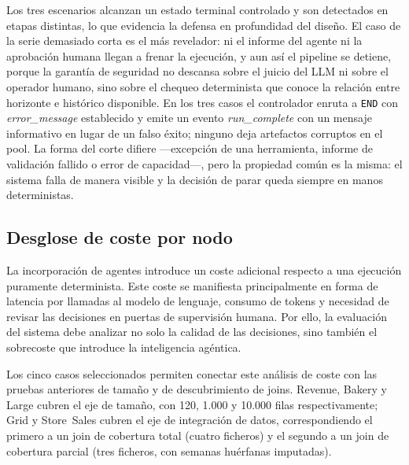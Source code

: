 \documentclass[12pt,a4paper]{article}
\theoremstyle{plain}
\begin{document}
Los tres escenarios alcanzan un estado terminal controlado y son detectados en etapas distintas, lo que evidencia la defensa en profundidad del diseño. El caso de la serie demasiado corta es el más revelador: ni el informe del agente ni la aprobación humana llegan a frenar la ejecución, y aun así el pipeline se detiene, porque la garantía de seguridad no descansa sobre el juicio del LLM ni sobre el operador humano, sino sobre el chequeo determinista que conoce la relación entre
horizonte e histórico disponible. En los tres casos el controlador enruta a \texttt{END} con \textit{error\_message} establecido y emite un evento
\textit{run\_complete} con un mensaje informativo en lugar de un falso éxito; ninguno deja artefactos corruptos en el pool. La forma del corte difiere —excepción de una herramienta, informe de validación fallido o error de capacidad—, pero la propiedad común es la misma: el sistema falla de manera visible y la decisión de parar queda siempre en manos deterministas.

\subsection{Desglose de coste por nodo}
\label{sec:coste-desglose}

La incorporación de agentes introduce un coste adicional respecto a una ejecución puramente
determinista. Este coste se manifiesta principalmente en forma de latencia por llamadas al
modelo de lenguaje, consumo de tokens y necesidad de revisar las decisiones en puertas de
supervisión humana. Por ello, la evaluación del sistema debe analizar no solo la calidad de
las decisiones, sino también el sobrecoste que introduce la inteligencia agéntica.

Los cinco casos seleccionados permiten conectar este análisis de coste con las pruebas
anteriores de tamaño y de descubrimiento de joins. Revenue, Bakery y Large cubren el
eje de tamaño, con 120, 1.000 y 10.000 filas respectivamente; Grid y Store~Sales cubren el eje
de integración de datos, correspondiendo el primero a un join de cobertura total
(cuatro ficheros) y el segundo a un join de cobertura parcial (tres ficheros, con
semanas huérfanas imputadas).
\end{document}

